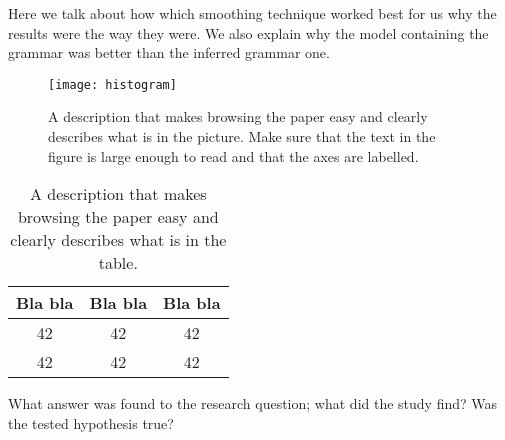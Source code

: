 \documentclass[ai15_group61_report.tex]{subfiles}
\begin{document}
Here we talk about how which smoothing technique worked best for us why the results were the way they were. We also explain why the model containing the grammar was better than the inferred grammar one.

\begin{figure}
\centering
\texttt{[image: histogram]}
\caption{A description that makes browsing the paper easy and clearly
describes what is in the picture. Make sure that the text in the figure
is large enough to read and that the axes are labelled.}
\label{fig:histogram}
\end{figure}



\begin{table}
\begin{center}
\begin{tabular}{|c|c|c|}
\hline
Bla bla & Bla bla & Bla bla \\ \hline
42 & 42 & 42 \\ \hline
42 & 42 & 42 \\ \hline
\end{tabular}
\caption{A description that makes browsing the paper easy and clearly
describes what is in the table.}
\label{tab:results}
\end{center}
\end{table}

What answer was found to the research question; what did the study find? Was the tested hypothesis true?

\end{document}
